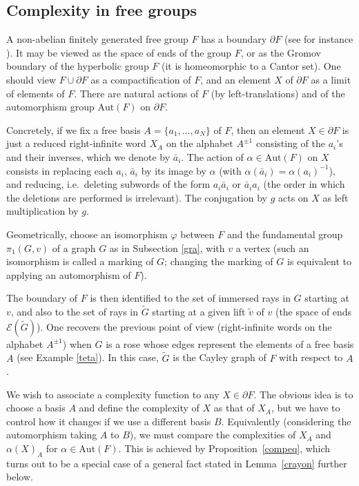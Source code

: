 \documentclass[11pt]{amsart}
\theoremstyle{remark}
\newcommand {\cale} {{\mathcal {E}}}
\newcommand{\Aut} {{\mathrm{Aut}}}
\newcommand{\bo}{\partial}
\begin{document}
\subsection{Complexity in free groups} \label{cfg}

A   non-abelian finitely generated free group $F$ has a boundary $\bo F$ (see for instance  
   \cite{BridHa,cooper,  GH,Loh}).  It may be viewed as the space of ends of the group $F$, or as the Gromov boundary of the hyperbolic group $F$ (it is homeomorphic to a Cantor set).  One should view $F\cup\bo F$ as a compactification of $F$, and an element $X$ of $\bo F$ as a limit of elements of $F$.    There are   natural actions of $F$ (by left-translations) and of the automorphism group $\Aut(F)$ on $\bo F$.





Concretely, if we fix a free basis $A=\{a_1,\dots,a_N\}$ of $F$, then  an element  $X \in\bo F$ is just a  reduced right-infinite word  $X_A
$ on the alphabet    $A^{\pm1}$ consisting of the $a_i$'s and their inverses, which we denote by $\bar a_i$. The action of $\alpha\in \Aut(F)$ on $X$ consists in replacing each $a_i$, $\bar a_i$ by its image by $\alpha$ (with $\alpha(\bar a_i)=\alpha(a_i)^{-1}$), and reducing, i.e.\  deleting subwords of the form $a_i\bar a_i$ or $\bar a_i a_i$ (the order in which the deletions are performed is irrelevant).    The conjugation by $g$ acts on $X$ as left multiplication by $g$.

   Geometrically,   choose an isomorphism $\varphi$ between  $F$ and the fundamental group $\pi_1(G,v)$ of a graph $G$ as in Subsection \ref{gra}, with  $v$ a   vertex (such an isomorphism is called a marking of $G$; changing the marking of $G$  is equivalent to applying  an automorphism of $F$).  
 

The boundary of $F$  is then identified to the set of immersed rays in $G$ starting at $v$, and also to   the set of rays in $\tilde G$ starting at a given lift $\tilde v$ of $v$ (the space of ends $\cale(\tilde G)$).    One recovers the previous point of view (right-infinite words on the alphabet $A^{\pm1}$) when $G$ is a rose whose edges represent the elements of a free basis $A$ (see Example \ref{teta}).    In this case, $\tilde G$ is the Cayley graph of $F$ with respect to $A$.

 
We wish to associate a complexity function to any $X\in\bo F$. 
The obvious idea is to    choose a basis $A$ and define the complexity of $X$ as that of $X_A$, but we have to control how it changes if we use a different basis $B$. Equivalently (considering the automorphism taking $A$ to $B$), we must compare the complexities of $X_A$ and $\alpha(X)_A$ for $\alpha\in\Aut(F)$.
 This is achieved by Proposition~\ref{compeq}, which turns out to be a special case of a general fact stated in Lemma~\ref{crayon} further below.
\end{document}
